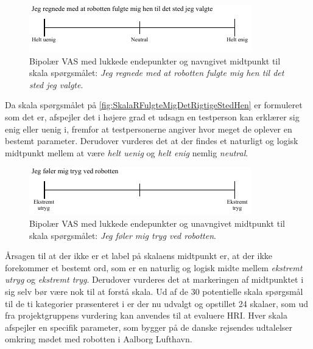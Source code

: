 %
\begin{figure}[H]
\centering
\includegraphics[width =\textwidth]{Figure/UdvalgteSkalaer/RobottenFulgteMigDetRigtigeStedHen} 
\caption{Bipolær VAS med lukkede endepunkter og navngivet midtpunkt til skala spørgsmålet: \textit{Jeg regnede med at robotten fulgte mig hen til det sted jeg valgte}.}
\label{fig:SkalaRFulgteMigDetRigtigeStedHen}
\end{figure}
\noindent
%
Da skala spørgsmålet på \autoref{fig:SkalaRFulgteMigDetRigtigeStedHen} er formuleret som det er, afspejler det i højere grad et udsagn en testperson kan erklærer sig enig eller uenig i, fremfor at testpersonerne angiver hvor meget de oplever en bestemt parameter. Derudover vurderes det at der findes et naturligt og logisk midtpunkt mellem at være \textit{helt uenig} og \textit{helt enig} nemlig \textit{neutral}.  
%
\begin{figure}[H]
\centering
\includegraphics[width =\textwidth]{Figure/UdvalgteSkalaer/TrygVedR} 
\caption{Bipolær VAS med lukkede endepunkter og unavngivet midtpunkt til skala spørgsmålet: \textit{Jeg føler mig tryg ved robotten}.}
\label{fig:SkalaTrygVedR}
\end{figure}
\noindent
%
Årsagen til at der ikke er et label på skalaens midtpunkt er, at der ikke forekommer et bestemt ord, som er en naturlig og logisk midte mellem \textit{ekstremt utryg} og \textit{ekstremt tryg}. Derudover vurderes det at markeringen af midtpunktet i sig selv bør være nok til at forstå skala.\blankline
%
Ud af de 30 potentielle skala spørgsmål til de ti kategorier præsenteret i  er der nu udvalgt og opstillet 24 skalaer, som ud fra projektgruppens vurdering kan anvendes til at evaluere HRI. Hver skala afspejler en specifik parameter, som bygger på de danske rejsendes udtalelser omkring mødet med robotten i Aalborg Lufthavn.     
